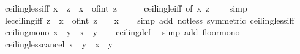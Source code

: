 \begin{isabellebody}
\endisatagproof
{\isafoldproof}%
%
\isadelimproof
\isanewline
%
\endisadelimproof
\isanewline
{}\isamarkupfalse%
\ ceiling{\isacharunderscore}{\kern0pt}less{\isacharunderscore}{\kern0pt}iff{\isacharcolon}{\kern0pt}\ {\isachardoublequoteopen}{\isasymlceil}x{\isasymrceil}\ {\isacharless}{\kern0pt}\ z\ {\isasymlongleftrightarrow}\ x\ {\isasymle}\ of{\isacharunderscore}{\kern0pt}int\ z\ {\isacharminus}{\kern0pt}\ {}{\isachardoublequoteclose}\isanewline
%
\isadelimproof
\ \ %
\endisadelimproof
%
\isatagproof
{}\isamarkupfalse%
\ ceiling{\isacharunderscore}{\kern0pt}le{\isacharunderscore}{\kern0pt}iff\ {\isacharbrackleft}{\kern0pt}of\ x\ {\isachardoublequoteopen}z\ {\isacharminus}{\kern0pt}\ {}{\isachardoublequoteclose}{\isacharbrackright}{\kern0pt}\ \isamarkupfalse%
\ simp%
\endisatagproof
{\isafoldproof}%
%
\isadelimproof
\isanewline
%
\endisadelimproof
\isanewline
{}\isamarkupfalse%
\ le{\isacharunderscore}{\kern0pt}ceiling{\isacharunderscore}{\kern0pt}iff{\isacharcolon}{\kern0pt}\ {\isachardoublequoteopen}z\ {\isasymle}\ {\isasymlceil}x{\isasymrceil}\ {\isasymlongleftrightarrow}\ of{\isacharunderscore}{\kern0pt}int\ z\ {\isacharminus}{\kern0pt}\ {}\ {\isacharless}{\kern0pt}\ x{\isachardoublequoteclose}\isanewline
%
\isadelimproof
\ \ %
\endisadelimproof
%
\isatagproof
{}\isamarkupfalse%
\ {\isacharparenleft}{\kern0pt}simp\ add{\isacharcolon}{\kern0pt}\ not{\isacharunderscore}{\kern0pt}less\ {\isacharbrackleft}{\kern0pt}symmetric{\isacharbrackright}{\kern0pt}\ ceiling{\isacharunderscore}{\kern0pt}less{\isacharunderscore}{\kern0pt}iff{\isacharparenright}{\kern0pt}%
\endisatagproof
{\isafoldproof}%
%
\isadelimproof
\isanewline
%
\endisadelimproof
\isanewline
{}\isamarkupfalse%
\ ceiling{\isacharunderscore}{\kern0pt}mono{\isacharcolon}{\kern0pt}\ {\isachardoublequoteopen}x\ {\isasymge}\ y\ {\isasymLongrightarrow}\ {\isasymlceil}x{\isasymrceil}\ {\isasymge}\ {\isasymlceil}y{\isasymrceil}{\isachardoublequoteclose}\isanewline
%
\isadelimproof
\ \ %
\endisadelimproof
%
\isatagproof
{}\isamarkupfalse%
\ ceiling{\isacharunderscore}{\kern0pt}def\ \isamarkupfalse%
\ {\isacharparenleft}{\kern0pt}simp\ add{\isacharcolon}{\kern0pt}\ floor{\isacharunderscore}{\kern0pt}mono{\isacharparenright}{\kern0pt}%
\endisatagproof
{\isafoldproof}%
%
\isadelimproof
\isanewline
%
\endisadelimproof
\isanewline
{}\isamarkupfalse%
\ ceiling{\isacharunderscore}{\kern0pt}less{\isacharunderscore}{\kern0pt}cancel{\isacharcolon}{\kern0pt}\ {\isachardoublequoteopen}{\isasymlceil}x{\isasymrceil}\ {\isacharless}{\kern0pt}\ {\isasymlceil}y{\isasymrceil}\ {\isasymLongrightarrow}\ x\ {\isacharless}{\kern0pt}\ y{\isachardoublequoteclose}\isanewline

\end{isabellebody}
